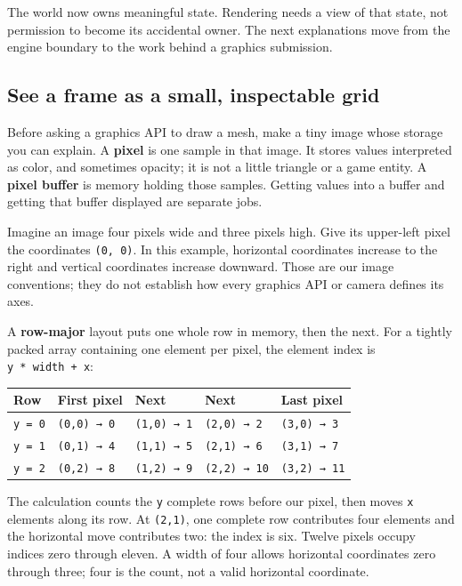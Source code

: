 The world now owns meaningful state. Rendering needs a view of that state, not permission to become its accidental owner. The next explanations move from the engine boundary to the work behind a graphics submission.

\subsection{See a frame as a small, inspectable grid}\label{06-engine-ii-ch025-see-a-frame-as-a-small-inspectable-grid}

Before asking a graphics API to draw a mesh, make a tiny image whose storage you can explain. A \textbf{pixel} is one sample in that image. It stores values interpreted as color, and sometimes opacity; it is not a little triangle or a game entity. A \textbf{pixel buffer} is memory holding those samples. Getting values into a buffer and getting that buffer displayed are separate jobs.

Imagine an image four pixels wide and three pixels high. Give its upper-left pixel the coordinates \texttt{(0,\ 0)}. In this example, horizontal coordinates increase to the right and vertical coordinates increase downward. Those are our image conventions; they do not establish how every graphics API or camera defines its axes.

A \textbf{row-major} layout puts one whole row in memory, then the next. For a tightly packed array containing one element per pixel, the element index is \texttt{y\ *\ width\ +\ x}:

{\def\LTcaptype{none} %
\begin{longtable}[]{@{}lllll@{}}
\toprule\noalign{}
Row & First pixel & Next & Next & Last pixel \\
\midrule\noalign{}
\endhead
\bottomrule\noalign{}
\endlastfoot
\texttt{y\ =\ 0} & \texttt{(0,0)\ →\ 0} & \texttt{(1,0)\ →\ 1} & \texttt{(2,0)\ →\ 2} & \texttt{(3,0)\ →\ 3} \\
\texttt{y\ =\ 1} & \texttt{(0,1)\ →\ 4} & \texttt{(1,1)\ →\ 5} & \texttt{(2,1)\ →\ 6} & \texttt{(3,1)\ →\ 7} \\
\texttt{y\ =\ 2} & \texttt{(0,2)\ →\ 8} & \texttt{(1,2)\ →\ 9} & \texttt{(2,2)\ →\ 10} & \texttt{(3,2)\ →\ 11} \\
\end{longtable}
}

The calculation counts the \texttt{y} complete rows before our pixel, then moves \texttt{x} elements along its row. At \texttt{(2,1)}, one complete row contributes four elements and the horizontal move contributes two: the index is six. Twelve pixels occupy indices zero through eleven. A width of four allows horizontal coordinates zero through three; four is the count, not a valid horizontal coordinate.

